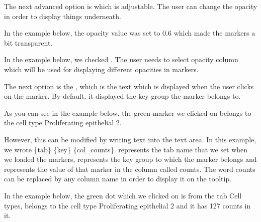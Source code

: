 \documentclass[letterpaper,10pt,english,openany,oneside]{sphinxmanual}
\begin{document}
\sphinxAtStartPar
The next advanced option is  which is adjustable. The user can change the opacity in order to display things underneath.

\sphinxAtStartPar
{}

\sphinxAtStartPar
In the example below, the opacity value was set to 0.6 which made the markers a bit transparent.

\sphinxAtStartPar
{}

\sphinxAtStartPar
In the example below, we checked . The user needs to select opacity column which will be used for displaying different opacities in markers.

\sphinxAtStartPar
{}

\sphinxAtStartPar
The next option is the , which is the text which is displayed when the user clicks on the marker. By default, it displayed the key group the marker belongs to.

\sphinxAtStartPar
{}

\sphinxAtStartPar
As you can see in the example below, the green marker we clicked on belongs to the cell type Proliferating epithelial 2.

\sphinxAtStartPar
{}

\sphinxAtStartPar
However, this can be modified by writing text into the text area. In this example, we wrote \{tab\} \sphinxhyphen{} \{key\} \sphinxhyphen{} \{col\_counts\}.  represents the tab name that we set when we loaded the markers,  represents the key group to which the marker belongs and  represents the value of that marker in the column called counts. The word counts can be replaced by any column name in order to display it on the tooltip.

\sphinxAtStartPar
{}

\sphinxAtStartPar
In the example below, the green dot which we clicked on is from the tab Cell types, belongs to the cell type Proliferating epithelial 2 and it has 127 counts in it.

\sphinxAtStartPar
{}
\end{document}
